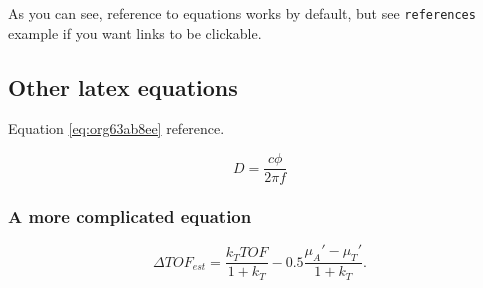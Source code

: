 As you can see, reference to equations works by default, but see \texttt{references}
example if you want links to be clickable.

\subsection{Other latex equations}
\label{sec:orgee46f83}
Equation \ref{eq:org63ab8ee} reference.

\begin{equation}
\label{eq:org63ab8ee}
D = \frac{c\phi}{2\pi f}
\end{equation}

\subsubsection{A more complicated equation}
\label{sec:org84a7de2}

\begin{equation}
\Delta TOF_{est} = \frac{k_T TOF}{1+k_T } - 0.5 \frac{\mu_A' - \mu_T'}{1+k_T}.
\end{equation}


